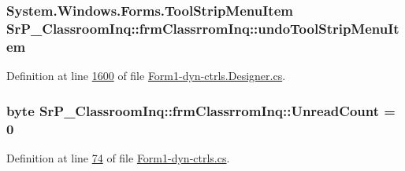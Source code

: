 \hypertarget{class_sr_p___classroom_inq_1_1frm_classrrom_inq_a8163a2e440678bc9508520209879805e}{
\subsubsection[{undo\-Tool\-Strip\-Menu\-Item}]{\setlength{\rightskip}{0pt plus 5cm}\-System.\-Windows.\-Forms.\-Tool\-Strip\-Menu\-Item {\bf \-Sr\-P\-\_\-\-Classroom\-Inq\-::frm\-Classrrom\-Inq\-::undo\-Tool\-Strip\-Menu\-Item}}}
\label{class_sr_p___classroom_inq_1_1frm_classrrom_inq_a8163a2e440678bc9508520209879805e}


\-Definition at line \hyperlink{_form1-dyn-ctrls_8_designer_8cs_source_l01600}{1600} of file \hyperlink{_form1-dyn-ctrls_8_designer_8cs_source}{\-Form1-\/dyn-\/ctrls.\-Designer.\-cs}.

\hypertarget{class_sr_p___classroom_inq_1_1frm_classrrom_inq_a9978aff45fb1057f102e224f8485f096}{
\subsubsection[{\-Unread\-Count}]{\setlength{\rightskip}{0pt plus 5cm}byte {\bf \-Sr\-P\-\_\-\-Classroom\-Inq\-::frm\-Classrrom\-Inq\-::\-Unread\-Count} = 0}}
\label{class_sr_p___classroom_inq_1_1frm_classrrom_inq_a9978aff45fb1057f102e224f8485f096}


\-Definition at line \hyperlink{_form1-dyn-ctrls_8cs_source_l00074}{74} of file \hyperlink{_form1-dyn-ctrls_8cs_source}{\-Form1-\/dyn-\/ctrls.\-cs}.

